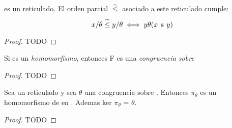 \begin{lemma}
   es un reticulado. El orden
  parcial $\overset{\sim}{\leq}$ asociado a este reticulado cumple:
  $$
  x/\theta \overset{\sim}{\leq} y/\theta \iff y\theta(x\textbf{ s }y)
  $$
\end{lemma}

\begin{proof}
  TODO
\end{proof}

\begin{lemma}
  Si  es un \emph{homomorfismo}, entonces F es una \emph{congruencia sobre} \reticulAlg
\end{lemma}
\begin{proof}
  TODO
\end{proof}

\begin{lemma}
  Sea \reticulAlg un reticulado y sea $\theta$ una congruencia sobre \reticulAlg. Entonces $\pi_\theta$ es un 
  homomorfismo de \reticulAlg en .
  Ademas ker $\pi_\theta$ = $\theta$.
\end{lemma}
\begin{proof}
  TODO
\end{proof}


